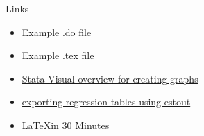 \documentclass{beamer}
\begin{document}
\begin{frame}{Links}

\begin{itemize}
\item \href{https://github.com/mhdsh1/are256b-w24/blob/main/example.do}
{Example .do file} 
\item \href{https://github.com/mhdsh1/are256b-w24/blob/main/example.tex}
{Example .tex file}
\item \href{https://www.stata.com/support/faqs/graphics/gph/stata-graphs/}
{Stata Visual overview for creating graphs}
\item \href{https://repec.sowi.unibe.ch/stata/estout/index.html}
{exporting regression tables using estout}
\item \href{https://www.overleaf.com/learn/latex/Learn_LaTeX_in_30_minutes}
{\LaTeX in 30 Minutes}
\end{itemize}

\end{frame}
\end{document}
